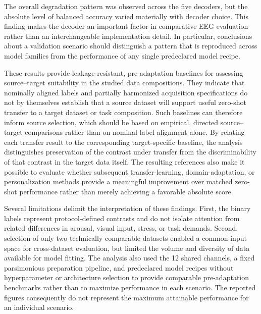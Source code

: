 \documentclass[10pt,letterpaper]{article}
\begin{document}
\medskip

The overall degradation pattern was observed across the five decoders, but the
absolute level of balanced accuracy varied materially with decoder choice.
This finding makes the decoder an important factor in comparative EEG
evaluation rather than an interchangeable implementation detail. In
particular, conclusions about a validation scenario should distinguish a
pattern that is reproduced across model families from the performance of any
single predeclared model recipe.

\medskip

These results provide leakage-resistant, pre-adaptation baselines for assessing
source--target suitability in the studied data compositions. They indicate that
nominally aligned labels and partially harmonized acquisition specifications do
not by themselves establish that a source dataset will support useful zero-shot
transfer to a target dataset or task composition. Such baselines can therefore
inform source selection, which should be based on empirical, directed
source--target comparisons rather than on nominal label alignment alone. By
relating each transfer result to the corresponding target-specific baseline,
the analysis distinguishes preservation of the contrast under transfer from
the discriminability of that contrast in the target data itself. The resulting
references also make it possible to evaluate whether subsequent
transfer-learning, domain-adaptation, or personalization methods provide a
meaningful improvement over matched zero-shot performance rather than merely
achieving a favorable absolute score.

\medskip

Several limitations delimit the interpretation of these findings. First, the
binary labels represent protocol-defined contrasts and do not isolate attention
from related differences in arousal, visual input, stress, or task demands.
Second, selection of only two technically comparable datasets enabled a common
input space for cross-dataset evaluation, but limited the volume and diversity
of data available for model fitting. The analysis also used the 12 shared
channels, a fixed parsimonious preparation pipeline, and predeclared model
recipes without hyperparameter or architecture selection to provide comparable
pre-adaptation benchmarks rather than to maximize performance in each
scenario. The reported figures consequently do not represent the maximum
attainable performance for an individual scenario.

\medskip
\end{document}
